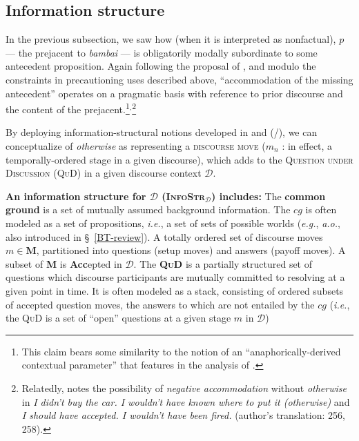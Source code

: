 \subsection{Information structure}\label{infstr}



In the previous subsection, we saw how (when it is interpreted as nonfactual), $ p $ --- the prejacent to \textit{bambai} --- is obligatorily modally subordinate to some antecedent proposition. Again following the proposal of \cite{PhilKotek}, and modulo the constraints in precautioning uses described above, ``accommodation of the missing antecedent'' operates on a pragmatic basis with reference to prior discourse  and the content of the prejacent.\footnote{This claim bears some similarity to the notion of an ``anaphorically-derived contextual parameter'' that features in the analysis of \citet[14]{Webber2001}.}$ ^, $\footnote{Relatedly, \citet{Corblin2002} notes the possibility of \textit{negative accommodation} without \textit{otherwise} in \textit{I didn't buy the car. I wouldn't have known where to put it (otherwise)} and \textit{I should have accepted. I wouldn't have been fired.} (author's translation: 256, 258).\label{corblin-modsub-note}}

By deploying information-structural notions developed in \citet{Carlson1983} and \citeauthor{Roberts1996a} (\citeyear{Roberts1996a}/\citeyear{Roberts2012}), we can conceptualize of \textit{otherwise} as representing a \textsc{discourse move} ($ m_n $ : in effect, a temporally-ordered stage in a given discourse), which adds to the \textsc{Question under Discussion (QuD)} in a given discourse context $ \mathcal D $.

\pex \textbf{An information structure for $ \mathcal D $ (\textsc{InfoStr}$ _\mathcal D $) includes:}
\a The \textbf{common ground} is a set of mutually assumed background information. The $cg$ is often modeled as a set of propositions, \textit{i.e.},  a set of sets of possible worlds (\textit{e.g.}, \citealt{Stalnaker1978} \textit{a.o.}, also introduced in \S~\ref{BT-review}). \label{common-ground}
\a A totally ordered set of discourse moves $ m\in\mathbf{M} $, partitioned into questions (setup moves) and answers (payoff moves). A subset of \textbf{M} is \textbf{Acc}epted in $ \mathcal D $.
\a The \textbf{\textsc{QuD}} is a partially structured set of questions which discourse participants are mutually committed to resolving at a given point in time. It is often modeled as a stack, consisting of ordered subsets of accepted question moves, the answers to which are not entailed by the $cg$ (\textit{i.e.}, the \textsc{QuD} is a set of ``open'' questions at a given stage $ m $ in $ \mathcal D $)\xe 



